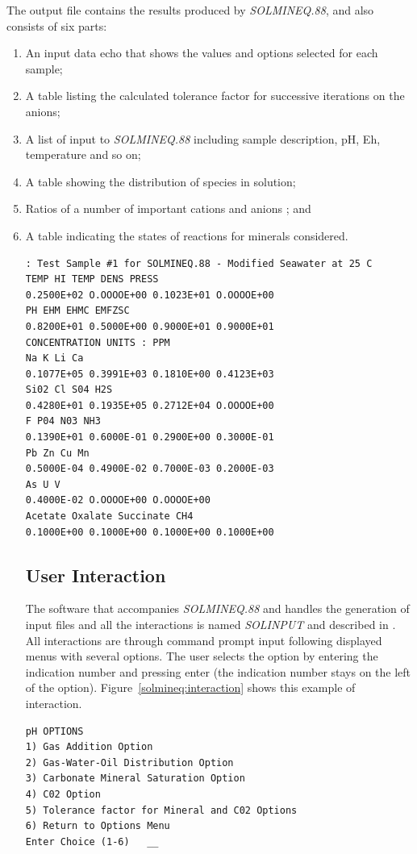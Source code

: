 The output file contains the results produced by \emph{SOLMINEQ.88}, and also consists of six parts: 
\begin{enumerate}
\item An input data echo that shows the values and options selected for each sample; 
\item A table listing the calculated tolerance factor for successive iterations on the anions; 
\item A list of input to \emph{SOLMINEQ.88} including sample description, pH, Eh, temperature and so on; 
\item A table showing the distribution of species in solution; 
\item Ratios of a number of important cations and anions ; and 
\item A table indicating the states of reactions for minerals considered.

\begin{minipage}[c]{0.92\textwidth}
\begin{lstlisting}[frame=single, caption=\emph{SOLMINEQ.88}'s excerpt from the output file, label=solmineq:output]
 : Test Sample #1 for SOLMINEQ.88 - Modified Seawater at 25 C
TEMP HI TEMP DENS PRESS
0.2500E+02 O.OOOOE+00 0.1023E+01 O.OOOOE+00
PH EHM EHMC EMFZSC
0.8200E+01 0.5000E+00 0.9000E+01 0.9000E+01
CONCENTRATION UNITS : PPM
Na K Li Ca
0.1077E+05 0.3991E+03 0.1810E+00 0.4123E+03
Si02 Cl S04 H2S
0.4280E+01 0.1935E+05 0.2712E+04 O.OOOOE+00
F P04 N03 NH3
0.1390E+01 0.6000E-01 0.2900E+00 0.3000E-01
Pb Zn Cu Mn
0.5000E-04 0.4900E-02 0.7000E-03 0.2000E-03
As U V
0.4000E-02 O.OOOOE+00 O.OOOOE+00
Acetate Oxalate Succinate CH4
0.1000E+00 0.1000E+00 0.1000E+00 0.1000E+00
\end{lstlisting}
\end{minipage}

\subsection{User Interaction}
The software that accompanies \emph{SOLMINEQ.88} and handles the generation of input files and all the interactions is named \emph{SOLINPUT} and described in \cite{Debraal:89}. All interactions are through command prompt input following displayed menus with several options. The user selects the option by entering the indication number and pressing enter (the indication number stays on the left of the option). Figure~\ref{solmineq:interaction} shows this example of interaction.

\begin{minipage}[c]{0.92\textwidth}
\begin{lstlisting}[frame=single, caption=\emph{SOLMINEQ.88}'s example of user interaction, label=solmineq:interaction]
	pH OPTIONS
1) Gas Addition Option
2) Gas-Water-Oil Distribution Option
3) Carbonate Mineral Saturation Option
4) C02 Option
5) Tolerance factor for Mineral and C02 Options
6) Return to Options Menu
Enter Choice (1-6)   __
\end{lstlisting}
\end{minipage}


\end{enumerate}
